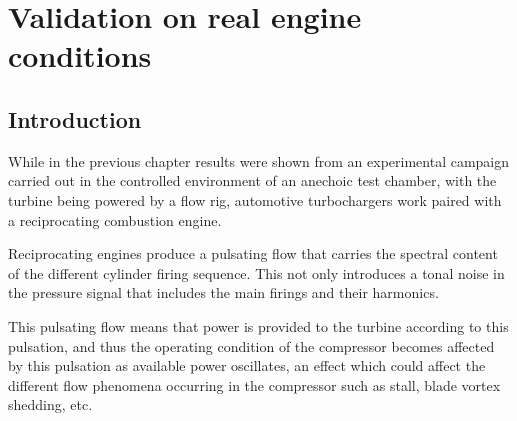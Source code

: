 \chapter{Validation on real engine conditions}
\label{cap:engine}


\section{Introduction}\label{sec:intro}
While in the previous chapter results were shown from an experimental campaign carried out in the controlled environment of an anechoic test chamber, with the turbine being powered by a flow rig, automotive turbochargers work paired with a reciprocating combustion engine.

Reciprocating engines produce a pulsating flow that carries the spectral content of the different cylinder firing sequence. This not only introduces a tonal noise in the pressure signal that includes the main firings and their harmonics.

This pulsating flow means that power is provided to the turbine according to this pulsation, and thus the operating condition of the compressor becomes affected by this pulsation as available power oscillates, an effect which could affect the different flow phenomena occurring in the compressor such as stall, blade vortex shedding, etc.

